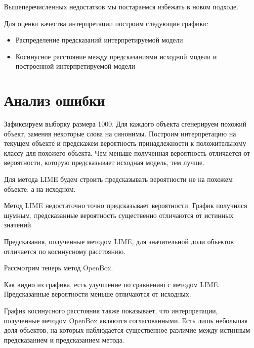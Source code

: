 \documentclass[a4paper, 12pt]{article}
\begin{document}
Вышеперечисленных недостатков мы постараемся избежать в новом подходе.

Для оценки качества интерпретации построим следующие графики:
\begin{itemize}
\item Распределение предсказаний интерпретируемой модели

\item Косинусное расстояние между предсказаниями исходной модели и построенной интерпретируемой модели
\end{itemize}

\section{Анализ ошибки}
Зафиксируем выборку размера 1000. Для каждого объекта сгенерируем похожий объект, заменяя некоторые слова на синонимы. Построим интерпретацию на текущем объекте и предскажем вероятность принадлежности к положительному классу для похожего объекта. Чем меньше полученная вероятность отличается от вероятности, которую предсказывает исходная модель, тем лучше.

Для метода LIME будем строить предсказывать вероятности не на похожем объекте, а на исходном.



Метод LIME недостаточно точно предсказывает вероятности. График получился шумным, предсказанные вероятность существенно отличаются от истинных значений.



Предсказания, полученные методом LIME, для значительной доли объектов отличается по косинусному расстоянию.

Рассмотрим теперь метод OpenBox.



Как видно из графика, есть улучшение по сравнению с методом LIME. Предсказанные вероятности меньше отличаются от исходных.



График косинусного расстояния также показывает, что интерпретации, полученные методом OpenBox являются согласованными. Есть лишь небольшая доля объектов, на которых наблюдается существенное различие между истинным предсказанием и предсказанием метода.
\end{document}

